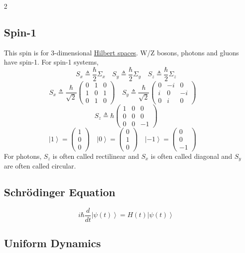 \documentclass[
]{article}
\let\oldhyperref\hyperref
\renewcommand{\hyperref}[2][]{\oldhyperref[#1]{\underline{#2}}}
\providecommand{\ket}[1]{\left\lvert #1 \right\rangle}
\begin{document}
\begin{multicols}{2}
	\subsection*{Spin-1}

	This spin is for 3-dimensional \hyperref[hilbert-spaces]{Hilbert spaces}.
	W/Z bosons, photons and gluons have spin-1.
	For spin-1 systems,
	\[
		S_x\triangleq\frac{\hbar}{2}\Sigma_x\quad
		S_y\triangleq\frac{\hbar}{2}\Sigma_y\quad
		S_z\triangleq\frac{\hbar}{2}\Sigma_z
	\]
	\[
		S_x\triangleq\frac{\hbar}{\sqrt{2}}\begin{pmatrix}0 & 1 & 0\\ 1 & 0 & 1\\ 0 & 1 & 0\end{pmatrix}\quad
		S_y\triangleq\frac{\hbar}{\sqrt{2}}\begin{pmatrix}0 & -i & 0\\ i & 0 & -i\\ 0 & i & 0\end{pmatrix}\quad
	\]
	\[
		S_z\triangleq\hbar\begin{pmatrix}1 & 0 & 0\\ 0 & 0 & 0\\ 0 & 0 & -1\end{pmatrix}
	\]
	\[
		\ket{1}=\begin{pmatrix}1 \\ 0 \\ 0\end{pmatrix}\quad
		\ket{0}=\begin{pmatrix}0 \\ 1 \\ 0\end{pmatrix}\quad
		\ket{-1}=\begin{pmatrix}0 \\ 0 \\ -1\end{pmatrix}\quad
	\]
	For photons, $S_z$ is often called rectilinear and $S_x$ is often called diagonal and $S_y$ are often called circular.

	\subsection*{Schrödinger Equation}

	\[
		i\hbar \frac{d}{dt}\ket{\psi(t)}=H(t)\ket{\psi(t)}
	\]

	\subsection*{Uniform Dynamics}


\end{multicols}
\end{document}
